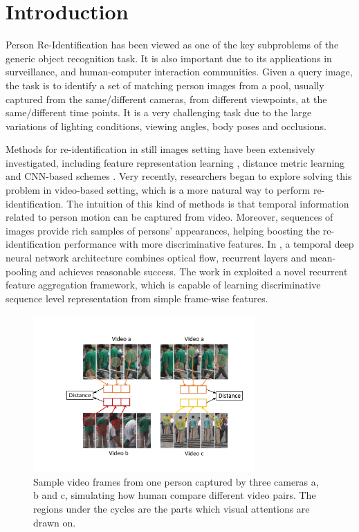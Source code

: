 \documentclass[10pt,twocolumn,letterpaper]{article}
\begin{document}
\section{Introduction}
Person Re-Identification has been viewed as one of the key subproblems of the generic object recognition task. It is also important due to its applications in surveillance, and human-computer interaction communities. Given a query image, the task is to identify a set of matching person images from a pool, usually captured from the same/different cameras, from different viewpoints, at the same/different time points. It is a very challenging task due to the large variations of lighting conditions, viewing angles, body poses and occlusions. 

Methods for re-identification in still images setting have been extensively investigated, including feature representation learning \cite{Kviatovsky,Ma,Liu,mid_level_filter}, distance metric learning \cite{Liao,R_D_C,kernal_metric,G_M_P,Salience_matching,metric_ensemble} and CNN-based schemes \cite{SCNN,RFA,NIPS2016_6367,DBLP:conf/eccv/VariorSLXW16}. Very recently, researchers began to explore solving this problem in video-based setting, which is a more natural way to perform re-identification. The intuition of this kind of methods is that temporal information related to person motion can be captured from video. Moreover, sequences of images provide rich samples of persons' appearances, helping boosting the re-identification performance with more discriminative features. In \cite{C_RNN}, a temporal deep neural network architecture combines optical flow, recurrent layers and mean-pooling and achieves reasonable success. The work in \cite{RFA} exploited a novel recurrent feature aggregation framework, which is capable of learning discriminative sequence level representation from simple frame-wise features. 

\begin{figure}
\centering
\includegraphics[width=8.5cm]{example.pdf}
\caption{Sample video frames from one person captured by three cameras a, b and c, simulating how human compare different video pairs. The regions under the cycles are the parts which visual attentions are drawn on.}
\label{fig:example}
\end{figure}
\end{document}
